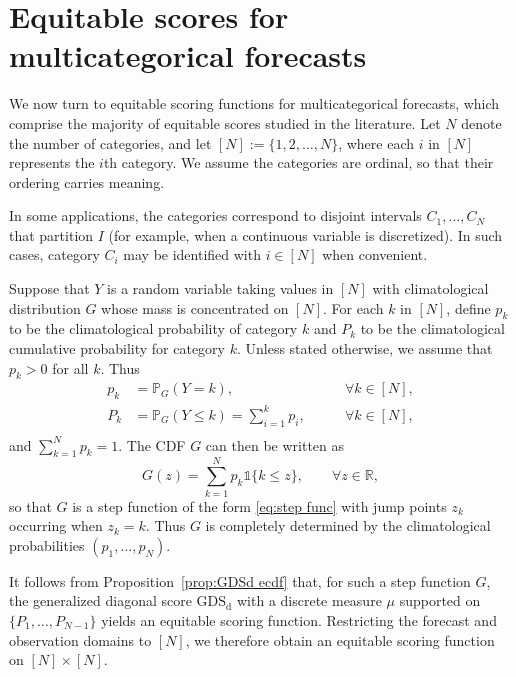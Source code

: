 \documentclass[10pt]{article} %
\theoremstyle{theorem}
\theoremstyle{definition}
\newcommand{\RRR}{\mathbb{R}}
\newcommand{\PPP}{\mathbb{P}}
\newcommand{\one}{\mathds{1}}
\newcommand{\GDSd}{\mathrm{GDS}_\mathrm{d}}
\begin{document}
\section{Equitable scores for multicategorical forecasts}\label{s:categorical equitable}

We now turn to equitable scoring functions for multicategorical forecasts, which comprise the majority of equitable scores studied in the literature. Let $N$ denote the number of categories, and let $[N] := \{1,2,\ldots,N\}$, where each $i$ in $[N]$ represents the $i$th category. We assume the categories are ordinal, so that their ordering carries meaning.

In some applications, the categories correspond to disjoint intervals $C_1,\ldots,C_N$ that partition $I$ (for example, when a continuous variable is discretized). In such cases, category $C_i$ may be identified with $i \in [N]$ when convenient.

Suppose that $Y$ is a random variable taking values in $[N]$ with climatological distribution $G$ whose mass is concentrated on $[N]$. For each $k$ in $[N]$, define $p_k$ to be the climatological probability of category $k$ and $P_k$ to be the climatological cumulative probability for category $k$. Unless stated otherwise, we assume that $p_k > 0$ for all $k$. Thus
\begin{align*}
p_k &= \PPP_G(Y = k), \qquad & \forall k \in [N], \\
P_k &= \PPP_G(Y \le k) = \sum_{i=1}^k p_i, \qquad &  \forall k \in [N], \\
\end{align*}
and $\sum_{k=1}^N p_k = 1$. The CDF $G$ can then be written as
\begin{equation}\label{eq:G categorical}
G(z)=\sum_{k=1}^N p_k \one\{k \leq z\}, \qquad \forall z \in\RRR,
\end{equation}
so that $G$ is a step function of the form \eqref{eq:step func} with jump points $z_k$ occurring when $z_k = k$. Thus $G$ is completely determined by the climatological probabilities $(p_1,\ldots,p_N)$.

It follows from Proposition~\ref{prop:GDSd ecdf} that, for such a step function $G$, the generalized diagonal score $\GDSd$ with a discrete measure $\mu$ supported on $\{P_1,\ldots,P_{N-1}\}$ yields an equitable scoring function. Restricting the forecast and observation domains to $[N]$, we therefore obtain an equitable scoring function on $[N]\times[N]$.
\end{document}
